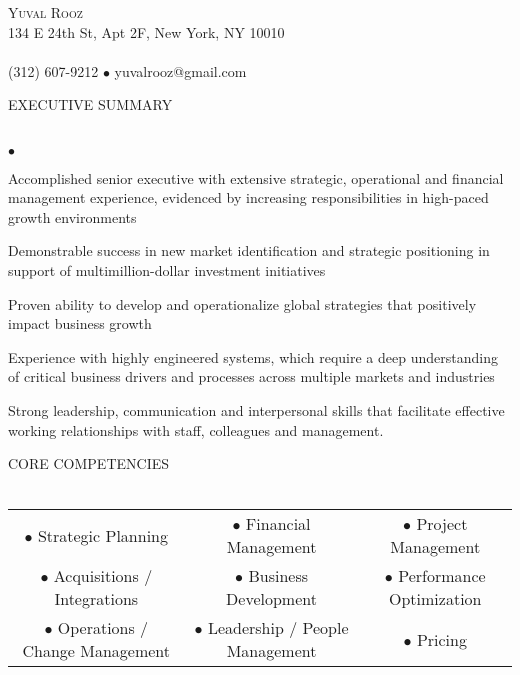 \documentclass[12pt]{article}
\newcommand{\lineunder}{\vspace*{-9pt} \\ \hspace*{-18pt} \hrulefill \\}
\newcommand{\header}[1]{{\hspace*{-15pt}\vspace*{6pt} \textsc{#1}} \vspace*{-9pt} \lineunder}
\newcommand{\contact}[3]{
\vspace*{-11pt}
\begin{center}
{\LARGE \scshape {#1}}\\
#2 \lineunder
#3
\end{center}
\vspace*{-4pt}
}
\newenvironment{achievements}{\begin{list}{$\bullet$}{\topsep 0pt \itemsep -2pt}}{\vspace*{4pt}\end{list}}
\begin{document}
\small
\smallskip
\vspace*{-44pt}

\contact{\LARGE{Yuval Rooz}}
{134 E 24th St, Apt 2F, New York, NY 10010}
{(312) 607-9212 $\bullet$ yuvalrooz@gmail.com}

\header{EXECUTIVE SUMMARY}
	\begin{achievements}
  	\item Accomplished senior executive with extensive strategic, operational
          and financial management experience, evidenced by increasing
          responsibilities in high-paced growth environments
  	\item Demonstrable success in new market identification and strategic
          positioning in support of multimillion-dollar investment initiatives
  	\item Proven ability to develop and operationalize global strategies that positively impact business growth
  	\item Experience with highly engineered systems, which require a deep
          understanding of critical business drivers and processes across multiple markets and industries
  	\item Strong leadership, communication and interpersonal skills that
          facilitate effective working relationships with staff, colleagues and management.
  \end{achievements}

\header{CORE COMPETENCIES}
\begin{center}
  \begin{tabular}{c c c}
    $\bullet$ Strategic Planning & $\bullet$ Financial Management & $\bullet$ Project Management \\
    $\bullet$ Acquisitions / Integrations & $\bullet$ Business Development & $\bullet$ Performance Optimization \\
    $\bullet$ Operations / Change Management & $\bullet$ Leadership / People Management & $\bullet$ Pricing
  \end{tabular}
\end{center}
\end{document}

